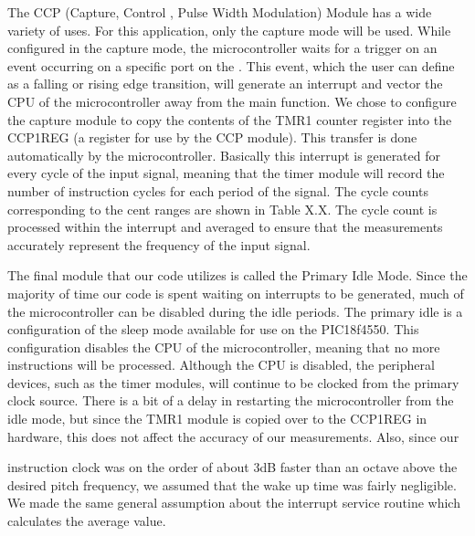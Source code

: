 \documentclass[12pt]{article}
\begin{document}
The CCP (Capture, Control , Pulse Width Modulation) Module has a wide variety of uses. For
this application, only the capture mode will be used. While configured in the capture mode, the
microcontroller waits for a trigger on an event occurring on a specific port on the . This event, which
the user can define as a falling or rising edge transition, will generate an interrupt and vector the CPU of
the microcontroller away from the main function. We chose to configure the capture module to copy
the contents of the TMR1 counter register into the CCP1REG (a register for use by the CCP module).
This transfer is done automatically by the microcontroller. Basically this interrupt is generated for every
cycle of the input signal, meaning that the timer module will record the number of instruction cycles
for each period of the signal. The cycle counts corresponding to the cent ranges are shown in Table
X.X. The cycle count is processed within the interrupt and averaged to ensure that the measurements
accurately represent the frequency of the input signal.

The final module that our code utilizes is called the Primary Idle Mode. Since the majority of time
our code is spent waiting on interrupts to be generated, much of the microcontroller can be disabled
during the idle periods. The primary idle is a configuration of the sleep mode available for use on
the PIC18f4550. This configuration disables the CPU of the microcontroller, meaning that no more
instructions will be processed. Although the CPU is disabled, the peripheral devices, such as the
timer modules, will continue to be clocked from the primary clock source. There is a bit of a delay
in restarting the microcontroller from the idle mode, but since the TMR1 module is copied over to
the CCP1REG in hardware, this does not affect the accuracy of our measurements. Also, since our

instruction clock was on the order of about 3dB faster than an octave above the desired pitch frequency,
we assumed that the wake up time was fairly negligible. We made the same general assumption about
the interrupt service routine which calculates the average value.
\end{document}
